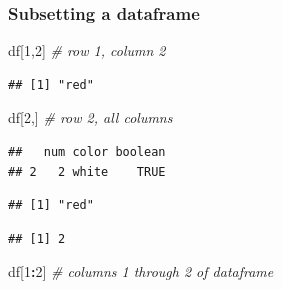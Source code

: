 \documentclass[
]{article}
\newenvironment{Shaded}{\begin{snugshade}}{\end{snugshade}}
\newcommand{\CommentTok}[1]{\textcolor[rgb]{0.56,0.35,0.01}{\textit{#1}}}
\newcommand{\DecValTok}[1]{\textcolor[rgb]{0.00,0.00,0.81}{#1}}
\newcommand{\NormalTok}[1]{#1}
\newcommand{\OperatorTok}[1]{\textcolor[rgb]{0.81,0.36,0.00}{\textbf{#1}}}
\begin{document}
\hypertarget{subsetting-a-dataframe}{%
\subsubsection{\texorpdfstring{\textbf{Subsetting a
dataframe}}{Subsetting a dataframe}}\label{subsetting-a-dataframe}}

\begin{Shaded}
\begin{Highlighting}[]
\NormalTok{df[}\DecValTok{1}\NormalTok{,}\DecValTok{2}\NormalTok{]  }\CommentTok{# row 1, column 2}
\end{Highlighting}
\end{Shaded}

\begin{verbatim}
## [1] "red"
\end{verbatim}

\begin{Shaded}
\begin{Highlighting}[]
\NormalTok{df[}\DecValTok{2}\NormalTok{,]  }\CommentTok{# row 2, all columns}
\end{Highlighting}
\end{Shaded}

\begin{verbatim}
##   num color boolean
## 2   2 white    TRUE
\end{verbatim}

\begin{Shaded}
\end{Shaded}

\begin{verbatim}
## [1] "red"
\end{verbatim}

\begin{Shaded}
\end{Shaded}

\begin{verbatim}
## [1] 2
\end{verbatim}

\begin{Shaded}
\begin{Highlighting}[]
\NormalTok{df[}\DecValTok{1}\OperatorTok{:}\DecValTok{2}\NormalTok{] }\CommentTok{# columns 1 through 2 of dataframe}
\end{Highlighting}
\end{Shaded}
\end{document}
